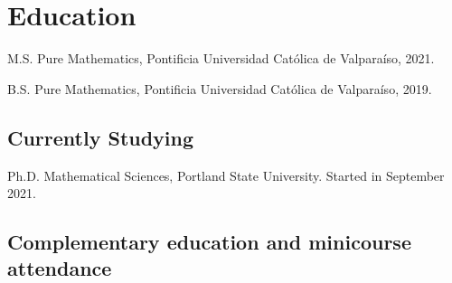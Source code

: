 \documentclass[12pt,letterpaper]{report}
\begin{document}
    
    \section*{Education}

    \begin{tablist}
        \item[M.S.]  \tab Pure Mathematics, Pontificia Universidad Cat\'olica de Valpara\'iso, 2021.
        \item[B.S.]  \tab Pure Mathematics, Pontificia Universidad Cat\'olica de Valpara\'iso, 2019.
    \end{tablist}

    \subsection*{Currently Studying}

    \begin{tablist}
        
        \item[Ph.D.] \tab Mathematical Sciences, Portland State University. Started in September 2021.
    \end{tablist}

    \subsection*{Complementary education and minicourse attendance}
\end{document}
